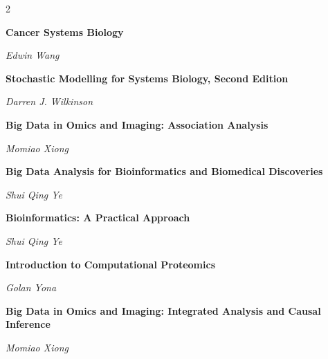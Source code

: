 \begin{multicols}{2}
\begin{minipage}{\linewidth}
\end{minipage}\par\medskip
\par\noindent\begin{minipage}{\linewidth}
\raggedright
\textbf{Cancer Systems Biology}\par
\textit{Edwin Wang}
\end{minipage}\par\medskip
\par\noindent\begin{minipage}{\linewidth}
\raggedright
\textbf{Stochastic Modelling for Systems Biology, Second Edition}\par
\textit{Darren J. Wilkinson}
\end{minipage}\par\medskip
\par\noindent\begin{minipage}{\linewidth}
\raggedright
\textbf{Big Data in Omics and Imaging: Association Analysis}\par
\textit{Momiao Xiong}
\end{minipage}\par\medskip
\par\noindent\begin{minipage}{\linewidth}
\raggedright
\textbf{Big Data Analysis for Bioinformatics and Biomedical Discoveries}\par
\textit{Shui Qing Ye}
\end{minipage}\par\medskip
\par\noindent\begin{minipage}{\linewidth}
\raggedright
\textbf{Bioinformatics: A Practical Approach}\par
\textit{Shui Qing Ye}
\end{minipage}\par\medskip
\par\noindent\begin{minipage}{\linewidth}
\raggedright
\textbf{Introduction to Computational Proteomics}\par
\textit{Golan Yona}
\end{minipage}\par\medskip
\par\noindent\begin{minipage}{\linewidth}
\raggedright
\textbf{Big Data in Omics and Imaging: Integrated Analysis and Causal Inference}\par
\textit{Momiao Xiong}
\end{minipage}\par\medskip
\end{multicols}
\endgroup
